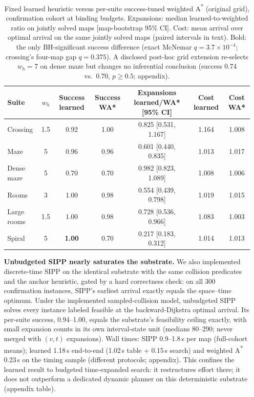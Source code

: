 \documentclass[letterpaper]{article} %
\begin{document}
\begin{table}[t]
\centering
\small
\begin{tabular}{lcccccc}
\toprule
Suite & $w_h$ & Success learned & Success WA* & Expansions learned/WA* [95\% CI] & Cost learned & Cost WA* \\
\midrule
Crossing & 1.5 & 0.92 & 1.00 & 0.825 [0.531, 1.167] & 1.164 & 1.008 \\
Maze & 5 & 0.96 & 0.96 & 0.601 [0.440, 0.835] & 1.013 & 1.017 \\
Dense maze & 5 & 0.70 & 0.70 & 0.982 [0.823, 1.089] & 1.008 & 1.006 \\
Rooms & 3 & 1.00 & 0.98 & 0.554 [0.439, 0.798] & 1.019 & 1.015 \\
Large rooms & 1.5 & 1.00 & 0.98 & 0.728 [0.536, 0.966] & 1.083 & 1.003 \\
Spiral & 5 & \textbf{1.00} & 0.70 & 0.217 [0.183, 0.312] & 1.014 & 1.013 \\
\bottomrule
\end{tabular}
\caption{Fixed learned heuristic versus per-suite success-tuned weighted A\textsuperscript{*} (original grid), confirmation cohort at binding budgets. Expansions: median learned-to-weighted ratio on jointly solved maps [map-bootstrap 95\% CI]. Cost: mean arrival over optimal arrival on the same jointly solved maps (paired intervals in text). Bold: the only BH-significant success difference (exact McNemar $q{=}3.7\times10^{-4}$; crossing's four-map gap $q{=}0.375$). A disclosed post-hoc grid extension re-selects $w_h{=}7$ on dense maze but changes no inferential conclusion (success 0.74 vs.\ 0.70, $p \geq 0.5$; appendix).}
\label{tab:wastar-main}
\end{table}

\textbf{Unbudgeted SIPP nearly saturates the substrate.} We also implemented discrete-time SIPP \citep{phillips2011sipp} on the identical substrate with the same collision predicates and the anchor heuristic, gated by a hard correctness check: on all 300 confirmation instances, SIPP's earliest arrival exactly equals the space--time optimum. Under the implemented sampled-collision model, unbudgeted SIPP solves every instance labeled feasible at the backward-Dijkstra optimal arrival. Its per-suite success, 0.94--1.00, equals the substrate's feasibility ceiling exactly, with small expansion counts in its own interval-state unit (medians 80--290; never merged with $(v,t)$ expansions). Wall times: SIPP 0.9--1.8\,s per map (full-cohort means); learned 1.18\,s end-to-end (1.02\,s table + 0.15\,s search) and weighted A\textsuperscript{*} 0.23\,s on the timing sample (different protocols; appendix). This confines the learned result to budgeted time-expanded search: it restructures effort there; it does not outperform a dedicated dynamic planner on this deterministic substrate (appendix table).
\end{document}
